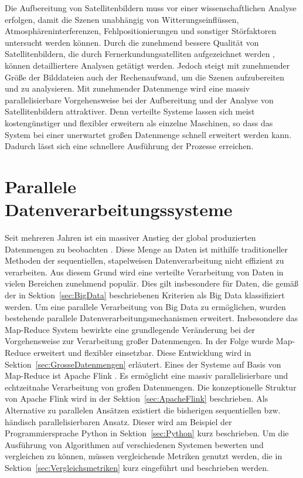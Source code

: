 Die Aufbereitung von Satellitenbildern muss vor einer wissenschaftlichen Analyse erfolgen, damit die Szenen unabhängig von Witterungseinflüssen, Atmosphäreninterferenzen, Fehlpositionierungen und sonstiger Störfaktoren untersucht werden können. Durch die zunehmend bessere Qualität von Satellitenbildern, die durch Fernerkundungsatelliten aufgezeichnet werden \cite{Markham2004}, können detailliertere Analysen getätigt werden. Jedoch steigt mit zunehmender Größe der Bilddateien auch der Rechenaufwand, um die Szenen aufzubereiten und zu analysieren. Mit zunehmender Datenmenge wird eine massiv parallelisierbare Vorgehensweise bei der Aufbereitung und der Analyse von Satellitenbildern attraktiver. Denn verteilte Systeme lassen sich meist kostengünstiger und flexibler erweitern als einzelne Maschinen, so dass das System bei einer unerwartet großen Datenmenge schnell erweitert werden kann. Dadurch lässt sich eine schnellere Ausführung der Prozesse erreichen.


\section{Parallele Datenverarbeitungssysteme}
Seit mehreren Jahren ist ein massiver Anstieg der global produzierten Datenmengen zu beobachten \cite{EMC2014}. Diese Menge an Daten ist mithilfe traditioneller Methoden der sequentiellen, stapelweisen Datenverarbeitung nicht effizient zu verarbeiten. Aus diesem Grund wird eine verteilte Verarbeitung von Daten in vielen Bereichen zunehmend populär. Dies gilt insbesondere für Daten, die gemäß der in Sektion~\ref{sec:BigData} beschriebenen Kriterien als Big Data klassifiziert werden. Um eine parallele Verarbeitung von Big Data zu ermöglichen, wurden bestehende parallele Datenverarbeitungsmechanismen erweitert. Insbesondere das Map-Reduce System \cite{Dean2004} bewirkte eine grundlegende Veränderung bei der Vorgehensweise zur Verarbeitung großer Datenmengen. In der Folge wurde Map-Reduce erweitert und flexibler einsetzbar. Diese Entwicklung wird in Sektion~\ref{sec:GrosseDatenmengen} erläutert. Eines der Systeme auf Basis von Map-Reduce ist Apache Flink \cite{FlinkWebsite}. Es ermöglicht eine massiv parallelisierbare und echtzeitnahe Verarbeitung von großen Datenmengen. Die konzeptionelle Struktur von Apache Flink wird in der Sektion~\ref{sec:ApacheFlink} beschrieben. Als Alternative zu parallelen Ansätzen existiert die bisherigen sequentiellen bzw. händisch parallelisierbaren Ansatz. Dieser wird am Beispiel der Programmiersprache Python in Sektion~\ref{sec:Python} kurz beschrieben. Um die Ausführung von Algorithmen auf verschiedenen Systemen bewerten und vergleichen zu können, müssen vergleichende Metriken genutzt werden, die in Sektion~\ref{sec:Vergleichsmetriken} kurz eingeführt und beschrieben werden. 

